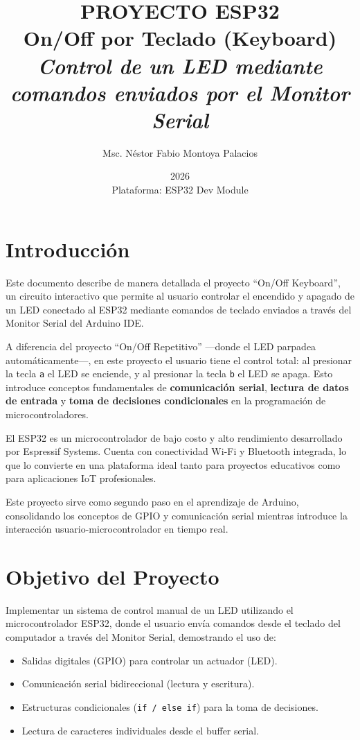 \documentclass[12pt,a4paper]{article}
\title{\Huge\textbf{PROYECTO ESP32} \\ \Large On/Off por Teclado (Keyboard) \\ \vspace{0.5cm} \normalsize \textit{Control de un LED mediante comandos enviados por el Monitor Serial}}
\author{Msc. Néstor Fabio Montoya Palacios}
\date{2026 \\ \vspace{0.2cm} \small Plataforma: ESP32 Dev Module}
\begin{document}
\maketitle
\tableofcontents
\newpage

\section{Introducción}

Este documento describe de manera detallada el proyecto ``On/Off Keyboard'', un circuito interactivo que permite al usuario controlar el encendido y apagado de un LED conectado al ESP32 mediante comandos de teclado enviados a través del Monitor Serial del Arduino IDE.

A diferencia del proyecto ``On/Off Repetitivo'' ---donde el LED parpadea automáticamente---, en este proyecto el usuario tiene el control total: al presionar la tecla \texttt{a} el LED se enciende, y al presionar la tecla \texttt{b} el LED se apaga. Esto introduce conceptos fundamentales de \textbf{comunicación serial}, \textbf{lectura de datos de entrada} y \textbf{toma de decisiones condicionales} en la programación de microcontroladores.

El ESP32 es un microcontrolador de bajo costo y alto rendimiento desarrollado por Espressif Systems. Cuenta con conectividad Wi-Fi y Bluetooth integrada, lo que lo convierte en una plataforma ideal tanto para proyectos educativos como para aplicaciones IoT profesionales.

Este proyecto sirve como segundo paso en el aprendizaje de Arduino, consolidando los conceptos de GPIO y comunicación serial mientras introduce la interacción usuario-microcontrolador en tiempo real.

\section{Objetivo del Proyecto}

Implementar un sistema de control manual de un LED utilizando el microcontrolador ESP32, donde el usuario envía comandos desde el teclado del computador a través del Monitor Serial, demostrando el uso de:
\begin{itemize}
    \item Salidas digitales (GPIO) para controlar un actuador (LED).
    \item Comunicación serial bidireccional (lectura y escritura).
    \item Estructuras condicionales (\texttt{if / else if}) para la toma de decisiones.
    \item Lectura de caracteres individuales desde el buffer serial.
\end{itemize}
\end{document}
